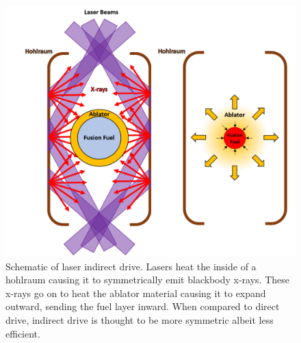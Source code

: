 \begin{figure}[h!]
	\centering
	\includegraphics[scale=0.4]{Figures/indirectDrive.pdf}
	\caption[Indirect Drive Schematic]{Schematic of laser indirect drive. Lasers heat the inside of a hohlraum causing it to symmetrically emit blackbody x-rays. These x-rays go on to heat the ablator material causing it to expand outward, sending the fuel layer inward. When compared to direct drive, indirect drive is thought to be more symmetric albeit less efficient. }
\end{figure}



